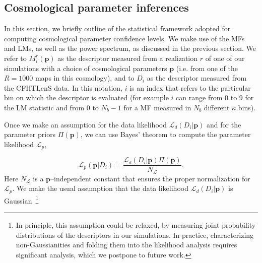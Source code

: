 \documentclass[reprint,aps,prd,superscriptaddress,showkeys,showpacs]{revtex4-1}
\begin{document}

\subsection{Cosmological parameter inferences}
\label{cosmostats}

In this section, we briefly outline of the statistical framework
adopted for computing cosmological parameter confidence levels.  We
make use of the MFs and LMs, as well as the power spectrum, as
discussed in the previous section. We refer to $M_i^r(\mathbf{p})$ as
the descriptor measured from a realization $r$ of one of our
simulations with a choice of cosmological parameters $\mathbf{p}$
(i.e. from one of the $R=1000$ maps in this cosmology), and to $D_i$
as the descriptor measured from the CFHTLenS data.
In this notation, $i$ is an index that refers to the particular bin on
which the descriptor is evaluated (for example $i$ can range from 0 to
9 for the LM statistic and from 0 to $N_b-1$ for a MF measured in
$N_b$ different $\kappa$ bins).


Once we make an assumption for the data likelihood
$\mathcal{L}_d(D_i\vert \mathbf{p})$ and for the parameter priors
$\Pi(\mathbf{p})$, we can use Bayes' theorem to compute the parameter
likelihood $\mathcal{L}_p$,

\begin{equation}
\label{parameterlikelihood}
\mathcal{L}_p(\mathbf{p}\vert D_i) = \frac{\mathcal{L}_d(D_i\vert \mathbf{p})\Pi(\mathbf{p})}{N_{\mathcal{L}}}.
\end{equation}
%
Here $N_{\mathcal{L}}$ is a $\mathbf{p}$--independent constant that
ensures the proper normalization for $\mathcal{L}_p$. We make the
usual assumption that the data likelihood $\mathcal{L}_d(D_i\vert
\mathbf{p})$ is Gaussian~\footnote{In principle, this assumption could
  be relaxed, by measuring joint probability distributions of the
  descriptors in our simulations.  In practice, characterizing
  non-Gaussianities and folding them into the likelihood analysis
  requires significant analysis, which we postpone to future work.}
\end{document}
